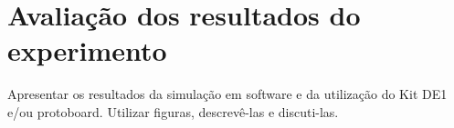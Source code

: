 \chapter{Avaliação dos resultados do experimento}
Apresentar os resultados da simulação em software e da utilização do Kit DE1 e/ou 
protoboard. Utilizar figuras, descrevê-las e discuti-las.

